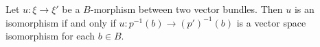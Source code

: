 Let $u: \xi \to \xi'$ be a $B$-morphism between two vector bundles. Then $u$ is an isomorphism if and only if $u: p^{-1}(b) \to (p')^{-1}(b)$ is a vector space isomorphism for each $b \in B$.
